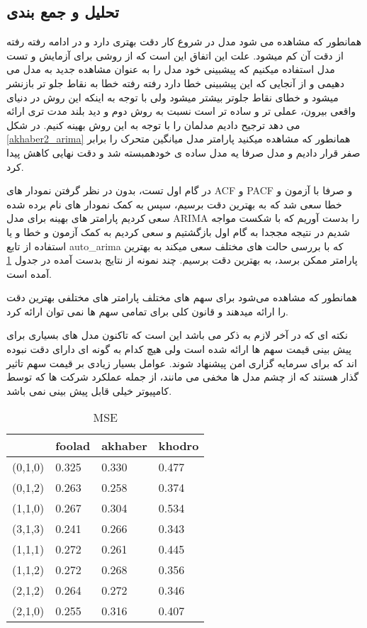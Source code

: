 \documentclass[12pt]{report}
\begin{document}
\subsection{تحلیل و جمع بندی}
همانطور که مشاهده می شود مدل در شروع کار دقت بهتری دارد و در ادامه رفته رفته از دقت آن کم میشود. علت این اتفاق این است که از روشی برای آزمایش و تست مدل استفاده میکنیم که پیشبینی خود مدل را به عنوان مشاهده جدید به مدل می دهیمی و از آنجایی که این پیشبینی خطا دارد رفته رفته خطا به نقاط جلو تر بازنشر میشود و خطای نقاط جلوتر بیشتر میشود ولی با توجه به اینکه این روش در دنیای واقعی بیرون، عملی تر و ساده تر است نسبت به روش دوم و دید بلند مدت تری ارائه می دهد ترجیح دادیم مدلمان را با توجه به این روش بهینه کنیم.
در شکل
\ref{akhaber2_arima}
همانطور که مشاهده میکنید پارامتر مدل میانگین متحرک را برابر صفر قرار دادیم و مدل صرفا یه مدل ساده ی خودهمبسته شد و دقت نهایی کاهش پیدا کرد.
\par
در گام اول تست، بدون در نظر گرفتن نمودار های ACF و PACF و صرفا با آزمون و خطا
سعی شد که به بهترین دقت برسیم، سپس به کمک نمودار های نام برده شده سعی کردیم پارامتر های بهینه برای مدل ARIMA را بدست آوریم که با شکست مواجه شدیم در نتیجه مججدا به گام اول بازگشتیم و سعی کردیم به کمک آزمون و خطا و یا استفاده از تابع
auto\_arima
که با بررسی حالت های مختلف سعی میکند به بهترین پارامتر ممکن برسد،
به بهترین دقت برسیم.
چند نمونه از نتایج بدست آمده در جدول
\ref{table2}
آمده است.
\par
همانطور که مشاهده می‌شود برای سهم های مختلف پارامتر های مختلفی بهترین دقت را ارائه میدهند و قانون کلی برای تمامی سهم ها نمی توان ارائه کرد.
\par
نکته ای که در آخر لازم به ذکر می باشد این است که تاکنون مدل های بسیاری برای پیش بینی قیمت سهم ها ارائه شده است ولی هیچ کدام به گونه ای دارای دقت نبوده اند که برای سرمایه گزاری امن پیشنهاد شوند. عوامل بسیار زیادی بر قیمت سهم تاثیر گذار هستند که از چشم مدل ها مخفی می مانند، از جمله عملکرد شرکت ها که توسط کامپیوتر خیلی قابل پیش بینی نمی باشد.
\begin{table}[]
\begin{latin}
\centering
\begin{tabular}{|l|l|l|l|}
\hline
        & foolad & akhaber & khodro \\ \hline
(0,1,0) & 0.325  & 0.330   & 0.477  \\ \hline
(0,1,2) & 0.263  & 0.258   & 0.374  \\ \hline
(1,1,0) & 0.267  & 0.304   & 0.534  \\ \hline
(3,1,3) & 0.241  & 0.266   & 0.343  \\ \hline
(1,1,1) & 0.272  & 0.261   & 0.445  \\ \hline
(1,1,2) & 0.272  & 0.268   & 0.356  \\ \hline
(2,1,2) & 0.264  & 0.272   & 0.346  \\ \hline
(2,1,0) & 0.255  & 0.316   & 0.407  \\ \hline
\end{tabular}
\end{latin}
\caption{MSE}
\label{table2}
\end{table}
\end{document}
